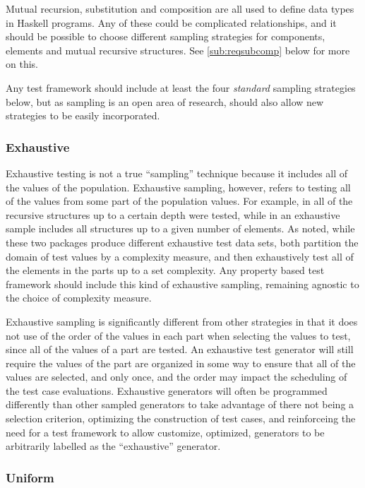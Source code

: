 Mutual recursion, substitution and composition are all used
to define data types in Haskell programs.
Any of these could be complicated relationships,
and it should be possible to choose different sampling strategies
for components, elements and mutual recursive structures.
See \ref{sub:reqsubcomp} below for more on this.

Any test framework  should include at least 
the four \emph{standard} sampling strategies below,
but as sampling is an open area of research, 
should also allow new strategies to be easily incorporated.

\subsubsection{Exhaustive}

Exhaustive testing is not a true ``sampling'' technique because 
it includes all of the values of the population.
Exhaustive sampling, however, refers to testing all of the values
from some part of the population values.
For example, in \SC all of the recursive structures up to a certain depth were tested,
while in \FEAT an exhaustive sample includes all structures up to a given number of elements.
As noted, while these two packages produce different exhaustive test data sets,
both partition the domain of test values by a complexity measure,
and then exhaustively test all of the elements in the parts up to a set complexity.
Any property based test framework should include this kind of exhaustive sampling,
remaining agnostic to the choice of complexity measure.

Exhaustive sampling is significantly different from other strategies
in that it does not use of the order of the values in each part when
selecting the values to test, since all of the values of a part are tested.
An exhaustive test generator will still require the values of the part are organized in some way
to ensure that all of the values are selected, and only once,
and the order may impact the scheduling of the test case evaluations.
Exhaustive generators will often be programmed differently than other sampled generators
to take advantage of there not being a selection criterion,
optimizing the construction of test cases,
and reinforceing the need for a test framework to allow customize, optimized, generators
to be arbitrarily labelled as the ``exhaustive'' generator.

\subsubsection{Uniform}


